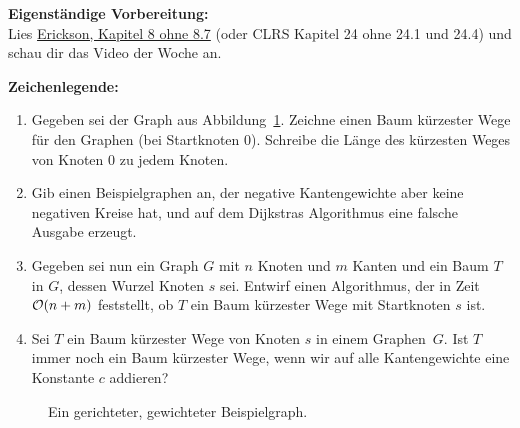\documentclass{uebung_cs}
\begin{document}
\textbf{Eigenständige Vorbereitung:}\\
Lies  \href{https://jeffe.cs.illinois.edu/teaching/algorithms/book/Algorithms-JeffE.pdf}{Erickson, Kapitel 8 ohne 8.7} (oder CLRS Kapitel 24 ohne 24.1 und 24.4) und schau dir das  Video der Woche an.

\textbf{Zeichenlegende:}
\legende{}


\begin{aufgabe}\label{tue-first}\mbox{}
	\begin{enumerate}
		\item %
    Gegeben sei der Graph aus Abbildung~\ref{example_graph}.
		Zeichne einen Baum kürzester Wege für den Graphen (bei Startknoten 0).
		Schreibe die Länge des kürzesten Weges von Knoten 0 zu jedem Knoten.
		\item Gib einen Beispielgraphen an, der negative Kantengewichte aber keine negativen Kreise hat, und auf dem Dijkstras Algorithmus eine falsche Ausgabe erzeugt.
		\item Gegeben sei nun ein Graph $G$ mit $n$ Knoten und $m$ Kanten und ein Baum $T$ in $G$, dessen Wurzel Knoten $s$ sei.
		Entwirf einen Algorithmus, der in Zeit $\mathcal{O}(n+m)$ feststellt, ob $T$ ein Baum kürzester Wege mit Startknoten $s$ ist.
		\item Sei $T$ ein Baum kürzester Wege von Knoten $s$ in einem Graphen~$G$.
		Ist $T$ immer noch ein Baum kürzester Wege, wenn wir auf alle Kantengewichte eine Konstante $c$ addieren?
	\end{enumerate}
\end{aufgabe}
\begin{figure}[h]
	\begin{center}
		\caption{\label{example_graph}Ein gerichteter, gewichteter Beispielgraph.}
	\end{center}
\end{figure}
\end{document}
